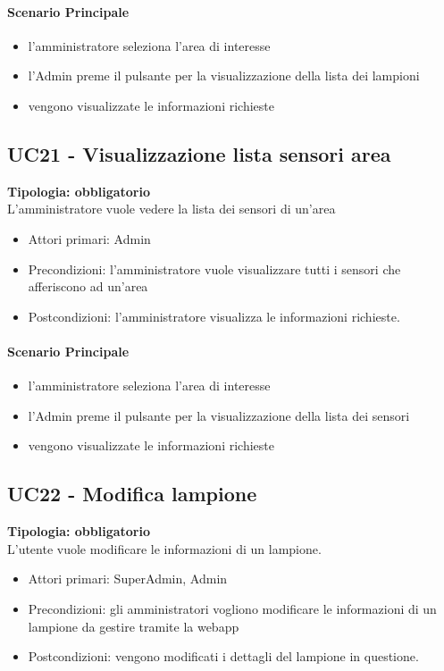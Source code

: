 \documentclass[12pt]{article}
\begin{document}
\paragraph{Scenario Principale}
\begin{itemize}
	\item l'amministratore seleziona l'area di interesse
	\item l'Admin preme il pulsante per la visualizzazione della lista dei lampioni
	\item vengono visualizzate le informazioni richieste
\end{itemize}

\subsection{UC21 - Visualizzazione lista sensori area}
\textbf{Tipologia: obbligatorio}\\
L'amministratore vuole vedere la lista dei sensori di un'area
\begin{itemize}
	\item Attori primari: Admin
	\item Precondizioni: l'amministratore vuole visualizzare tutti i sensori che afferiscono ad un'area
	\item Postcondizioni: l'amministratore visualizza le informazioni richieste. 
\end{itemize}
\paragraph{Scenario Principale}
\begin{itemize}
	\item l'amministratore seleziona l'area di interesse
	\item l'Admin preme il pulsante per la visualizzazione della lista dei sensori
	\item vengono visualizzate le informazioni richieste
\end{itemize}

\subsection{UC22 - Modifica lampione}
\textbf{Tipologia: obbligatorio} \\
L'utente vuole modificare le informazioni di un lampione.
\begin{itemize}
	\item Attori primari: SuperAdmin, Admin
	\item Precondizioni: gli amministratori vogliono modificare le informazioni di un lampione da gestire tramite la webapp
	\item Postcondizioni: vengono modificati i dettagli del lampione in questione.
\end{itemize}
\end{document}
